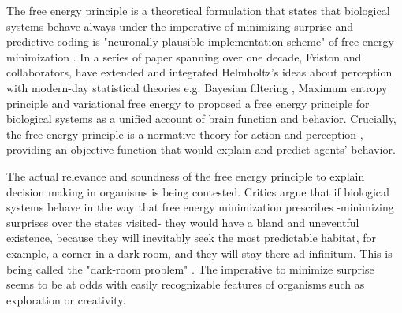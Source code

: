 \documentclass[11pt, onecolumn]{article}
\begin{document}
The free energy principle is a theoretical formulation that states that biological systems behave always under the imperative of minimizing surprise and predictive coding is "neuronally plausible implementation scheme" of free energy minimization \citep{schwartenbeck_exploration_2013}. In a series of paper spanning over one decade, Friston and collaborators, have extended and integrated Helmholtz’s ideas about perception with modern-day statistical theories e.g. Bayesian filtering \citep{friston_theory_2005}, Maximum entropy principle \citep{Jaynes:2003} and variational free energy \citep{Hinton-Camp:1993} to proposed a free energy principle for biological systems as a unified account of brain function and behavior.
Crucially, the free energy principle is a normative theory for action and perception \citep{schwartenbeck_exploration_2013}, providing an objective function that would explain and predict agents' behavior. 

The actual relevance and soundness of the free energy principle to explain decision making in organisms is being contested. Critics argue that if biological systems behave in the way that free energy minimization prescribes -minimizing surprises over the states visited- they would have a bland and uneventful existence, because they will inevitably seek the most predictable habitat, for example, a corner in a dark room, and they will stay there ad infinitum. This is being called the "dark-room problem" \citep{friston_free-energy_2012}. The imperative to minimize surprise seems to be at odds with easily recognizable features of organisms such as exploration or creativity.
\end{document}
